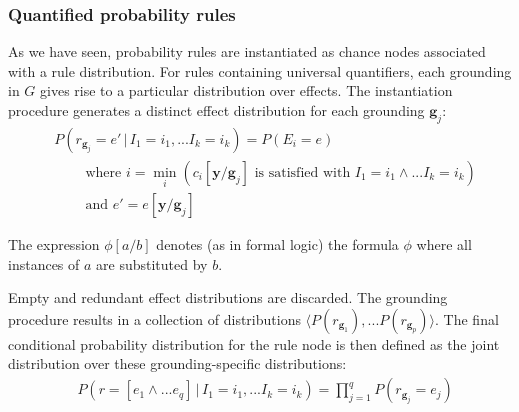 

\subsubsection*{Quantified probability rules}

As we have seen, probability rules are instantiated as chance nodes associated with a rule distribution.  For rules containing universal quantifiers, each grounding in $G$ gives rise to a particular distribution over effects.  The instantiation procedure generates a distinct effect distribution for each grounding $\mathbf{g}_j$: 
\begin{align}
& P(r_{\mathbf{g}_j}\!=\!e' \, | \, I_1\!=\!i_1,... I_k\!=\!i_k) = P(E_i = e) \label{eq:quantifruledistrib}
 \\
& \; \; \; \; \; \; \; \; \text{where } i = \min_i (c_i[\mathbf{y} / \mathbf{g}_j]\text{ is satisfied with } I_1\!=\!i_1 \land ... I_k\!=\!i_k) \nonumber \\ 
& \; \; \; \; \; \; \; \; \text{and } e' = e [\mathbf{y} / \mathbf{g}_j] \nonumber
\end{align}

The expression $\phi[a/b]$ denotes (as in formal logic) the formula $\phi$ where all instances of $a$ are substituted by $b$.

Empty and redundant effect distributions are discarded. The grounding procedure results in a  collection of distributions $ \langle P(r_{\mathbf{g}_1}),... P(r_{\mathbf{g}_p}) \rangle$.    The final conditional probability distribution for the rule node is then defined as the joint distribution over these grounding-specific distributions: 
\begin{align}
& P(r\!=\![e_1 \land ... e_{q}] \, | \, I_1\!=\!i_1,... I_k\!=\!i_k) = \prod_{j=1}^{q} P(r_{\mathbf{g}_j}\!=\!e_j)
\end{align}

